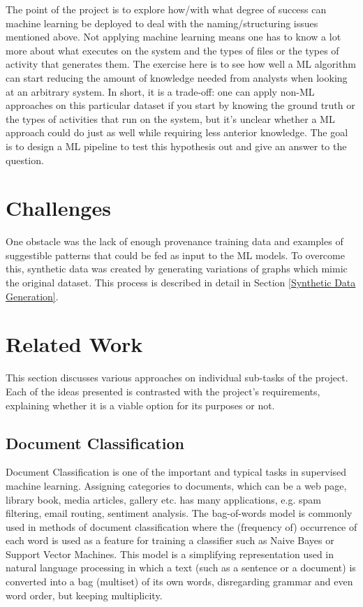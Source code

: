 The point of the project is to explore how/with what degree of success can machine learning be deployed to deal with the naming/structuring issues mentioned above. Not applying machine learning means one has to know a lot more about what executes on the system and the types of files or the types of activity that generates them. The exercise here is to see how well a ML algorithm can start reducing the amount of knowledge needed from analysts when looking at an arbitrary system. In short, it is a trade-off: one can apply non-ML approaches on this particular dataset if you start by knowing the ground truth or the types of activities that run on the system, but it's unclear whether a ML approach could do just as well while requiring less anterior knowledge. The goal is to design a ML pipeline to test this hypothesis out and give an answer to the question. \\

\section{Challenges}

One obstacle was the lack of enough provenance training data and examples of suggestible patterns that could be fed as input to the ML models. To overcome this, synthetic data was created by generating variations of graphs which mimic the original dataset. This process is described in detail in Section \ref{Synthetic Data Generation}.

\section{Related Work}

This section discusses various approaches on individual sub-tasks of the project. Each of the ideas presented is contrasted with the project's requirements, explaining whether it is a viable option for its purposes or not. \\

\subsection{Document Classification}

Document Classification is one of the important and typical tasks in supervised machine learning. Assigning categories to documents, which can be a web page, library book, media articles, gallery etc. has many applications, e.g. spam filtering, email routing, sentiment analysis. The bag-of-words model is commonly used in methods of document classification where the (frequency of) occurrence of each word is used as a feature for training a classifier such as Naive Bayes or Support Vector Machines. This model is a simplifying representation used in natural language processing in which a text (such as a sentence or a document) is converted into a bag (multiset) of its own words, disregarding grammar and even word order, but keeping multiplicity. \\


